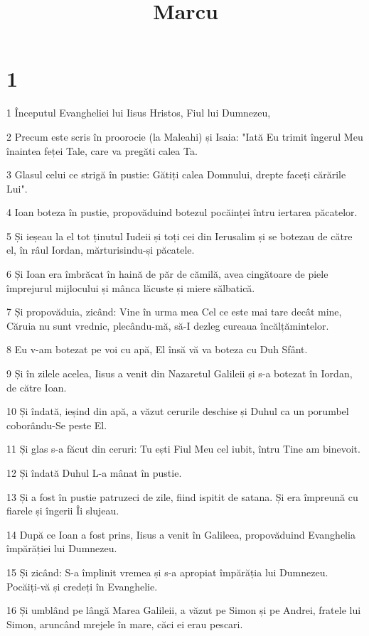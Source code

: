 

\title{Marcu}


\chapter{1}

\par 1 Începutul Evangheliei lui Iisus Hristos, Fiul lui Dumnezeu,
\par 2 Precum este scris în proorocie (la Maleahi) și Isaia: "Iată Eu trimit îngerul Meu înaintea feței Tale, care va pregăti calea Ta.
\par 3 Glasul celui ce strigă în pustie: Gătiți calea Domnului, drepte faceți cărările Lui".
\par 4 Ioan boteza în pustie, propovăduind botezul pocăinței întru iertarea păcatelor.
\par 5 Și ieșeau la el tot ținutul Iudeii și toți cei din Ierusalim și se botezau de către el, în râul Iordan, mărturisindu-și păcatele.
\par 6 Și Ioan era îmbrăcat în haină de păr de cămilă, avea cingătoare de piele împrejurul mijlocului și mânca lăcuste și miere sălbatică.
\par 7 Și propovăduia, zicând: Vine în urma mea Cel ce este mai tare decât mine, Căruia nu sunt vrednic, plecându-mă, să-I dezleg cureaua încălțămintelor.
\par 8 Eu v-am botezat pe voi cu apă, El însă vă va boteza cu Duh Sfânt.
\par 9 Și în zilele acelea, Iisus a venit din Nazaretul Galileii și s-a botezat în Iordan, de către Ioan.
\par 10 Și îndată, ieșind din apă, a văzut cerurile deschise și Duhul ca un porumbel coborându-Se peste El.
\par 11 Și glas s-a făcut din ceruri: Tu ești Fiul Meu cel iubit, întru Tine am binevoit.
\par 12 Și îndată Duhul L-a mânat în pustie.
\par 13 Și a fost în pustie patruzeci de zile, fiind ispitit de satana. Și era împreună cu fiarele și îngerii Îi slujeau.
\par 14 După ce Ioan a fost prins, Iisus a venit în Galileea, propovăduind Evanghelia împărăției lui Dumnezeu.
\par 15 Și zicând: S-a împlinit vremea și s-a apropiat împărăția lui Dumnezeu. Pocăiți-vă și credeți în Evanghelie.
\par 16 Și umblând pe lângă Marea Galileii, a văzut pe Simon și pe Andrei, fratele lui Simon, aruncând mrejele în mare, căci ei erau pescari.
